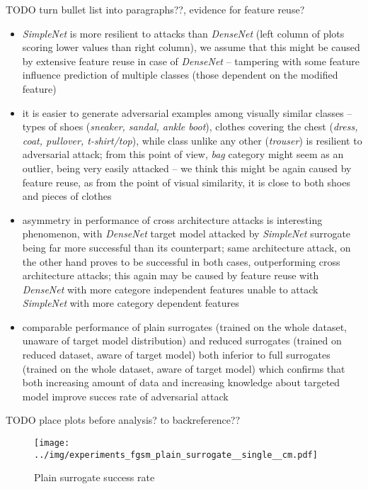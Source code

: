 TODO turn bullet list into paragraphs??, evidence for feature reuse?
\begin{itemize}
\item \textit{SimpleNet} is more resilient to attacks than \textit{DenseNet} (left column of plots scoring lower values than right column), we assume that this might be caused by extensive feature reuse in case of \textit{DenseNet} -- tampering with some feature influence prediction of multiple classes (those dependent on the modified feature)
\item it is easier to generate adversarial examples among visually similar classes -- types of shoes (\textit{sneaker, sandal, ankle boot}), clothes covering the chest (\textit{dress, coat, pullover, t-shirt/top}), while class unlike any other (\textit{trouser}) is resilient to adversarial attack; from this point of view, \textit{bag} category might seem as an outlier, being very easily attacked -- we think this might be again caused by feature reuse, as from the point of visual similarity, it is close to both shoes and pieces of clothes
\item asymmetry in performance of cross architecture attacks is interesting phenomenon, with \textit{DenseNet} target model attacked by \textit{SimpleNet} surrogate being far more successful than its counterpart; same architecture attack, on the other hand proves to be successful in both cases, outperforming cross architecture attacks; this again may be caused by feature reuse with \textit{DenseNet} with more categore independent features unable to attack \textit{SimpleNet} with more category dependent features
\item comparable performance of plain surrogates (trained on the whole dataset, unaware of target model distribution) and reduced surrogates (trained on reduced dataset, aware of target model) both inferior to full surrogates (trained on the whole dataset, aware of target model) which confirms that both increasing amount of data and increasing knowledge about targeted model improve succes rate of adversarial attack
\end{itemize}

TODO place plots before analysis? to backreference??

\begin{figure}
    \centering
    \texttt{[image: ../img/experiments\_fgsm\_plain\_surrogate\_\_single\_\_cm.pdf]}
    \caption{Plain surrogate success rate}
    \label{fig:plain_surrogate}
\end{figure}


